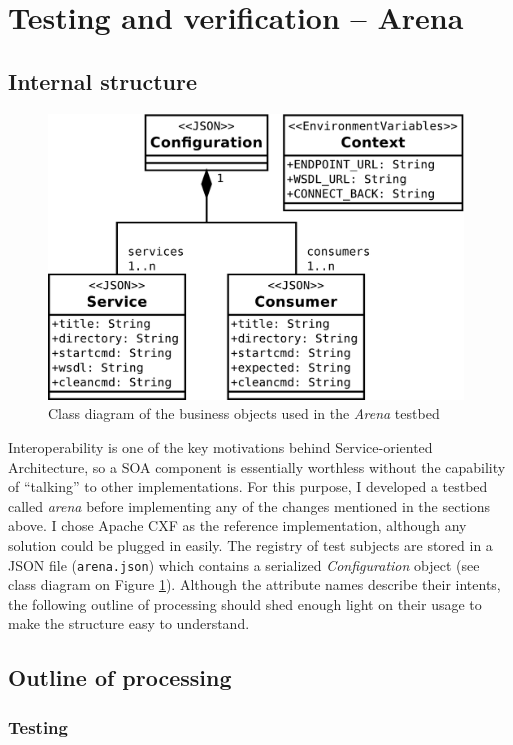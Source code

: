 \section{Testing and verification -- Arena}
\label{arena}

\subsection{Internal structure}

\begin{figure}[htbp]
 \centering
 \includegraphics[width=11cm]{images/clsdArena.pdf}
 \caption{Class diagram of the business objects used in the \emph{Arena} testbed}
 \label{fig:clsdArena}
\end{figure}

Interoperability is one of the key motivations behind Service-oriented Architecture, so a SOA component is essentially worthless without the capability of ``talking'' to other implementations. For this purpose, I developed a testbed called \emph{arena} before implementing any of the changes mentioned in the sections above. I chose Apache CXF as the reference implementation, although any solution could be plugged in easily. The registry of test subjects are stored in a JSON file (\verb|arena.json|) which contains a serialized \emph{Configuration} object (see class diagram on Figure \ref{fig:clsdArena}). Although the attribute names describe their intents, the following outline of processing should shed enough light on their usage to make the structure easy to understand.

\subsection{Outline of processing}

\subsubsection{Testing}
\label{arena_test}

